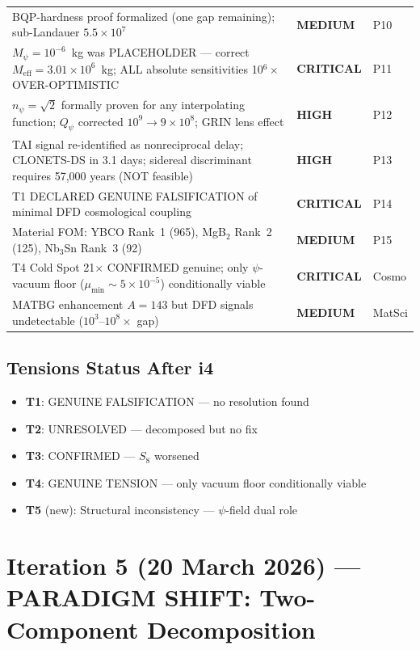 \documentclass[11pt,a4paper]{article}
\newcommand{\CRITICAL}{\textcolor{critical}{\textbf{CRITICAL}}}
\newcommand{\HIGH}{\textcolor{high}{\textbf{HIGH}}}
\newcommand{\MEDIUM}{\textcolor{medium}{\textbf{MEDIUM}}}
\newcommand{\PARADIGM}{\textcolor{paradigm}{\textbf{PARADIGM SHIFT}}}
\begin{document}
\begin{longtable}{p{}p{}p{}}
BQP-hardness proof formalized (one gap remaining); sub-Landauer $5.5\times10^7$ & \MEDIUM & P10 \\
$M_\psi=10^{-6}$~kg was PLACEHOLDER --- correct $M_\mathrm{eff}=3.01\times10^6$~kg; ALL absolute sensitivities 10$^6\times$ OVER-OPTIMISTIC & \CRITICAL & P11 \\
$n_\psi=\sqrt{2}$ formally proven for any interpolating function; $Q_\psi$ corrected $10^9\to9\times10^8$; GRIN lens effect & \HIGH & P12 \\
TAI signal re-identified as nonreciprocal delay; CLONETS-DS in 3.1 days; sidereal discriminant requires 57,000 years (NOT feasible) & \HIGH & P13 \\
T1 DECLARED GENUINE FALSIFICATION of minimal DFD cosmological coupling & \CRITICAL & P14 \\
Material FOM: YBCO Rank~1 (965), MgB$_2$ Rank~2 (125), Nb$_3$Sn Rank~3 (92) & \MEDIUM & P15 \\
T4 Cold Spot 21$\times$ CONFIRMED genuine; only $\psi$-vacuum floor ($\mu_\mathrm{min}\sim5\times10^{-5}$) conditionally viable & \CRITICAL & Cosmo \\
MATBG enhancement $A=143$ but DFD signals undetectable ($10^3$--$10^8\times$ gap) & \MEDIUM & MatSci \\
\bottomrule
\end{longtable}

\subsection{Tensions Status After i4}
\begin{itemize}[nosep]
\item \textbf{T1}: GENUINE FALSIFICATION --- no resolution found
\item \textbf{T2}: UNRESOLVED --- decomposed but no fix
\item \textbf{T3}: CONFIRMED --- $S_8$ worsened
\item \textbf{T4}: GENUINE TENSION --- only vacuum floor conditionally viable
\item \textbf{T5} (new): Structural inconsistency --- $\psi$-field dual role
\end{itemize}


\section{Iteration 5 (20 March 2026) --- \PARADIGM: Two-Component Decomposition}
\end{document}
